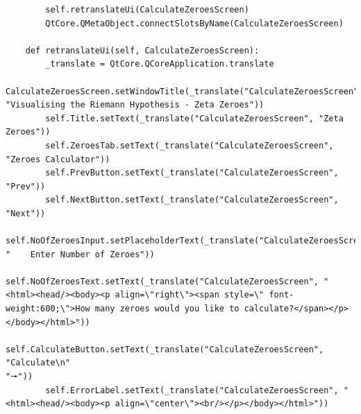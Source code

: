 \documentclass{article}
\begin{document}
\begin{lstlisting}
        self.retranslateUi(CalculateZeroesScreen)
        QtCore.QMetaObject.connectSlotsByName(CalculateZeroesScreen)

    def retranslateUi(self, CalculateZeroesScreen):
        _translate = QtCore.QCoreApplication.translate
        CalculateZeroesScreen.setWindowTitle(_translate("CalculateZeroesScreen", "Visualising the Riemann Hypothesis - Zeta Zeroes"))
        self.Title.setText(_translate("CalculateZeroesScreen", "Zeta Zeroes"))
        self.ZeroesTab.setText(_translate("CalculateZeroesScreen", "Zeroes Calculator"))
        self.PrevButton.setText(_translate("CalculateZeroesScreen", "Prev"))
        self.NextButton.setText(_translate("CalculateZeroesScreen", "Next"))
        self.NoOfZeroesInput.setPlaceholderText(_translate("CalculateZeroesScreen", "    Enter Number of Zeroes"))
        self.NoOfZeroesText.setText(_translate("CalculateZeroesScreen", "<html><head/><body><p align=\"right\"><span style=\" font-weight:600;\">How many zeroes would you like to calculate?</span></p></body></html>"))
        self.CalculateButton.setText(_translate("CalculateZeroesScreen", "Calculate\n"
"🠖"))
        self.ErrorLabel.setText(_translate("CalculateZeroesScreen", "<html><head/><body><p align=\"center\"><br/></p></body></html>"))
\end{lstlisting}
\end{document}
